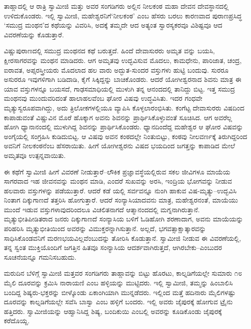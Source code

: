 ತಾಹ್ಲಾದಲ್ಲಿ ಆ ರಾತ್ರಿ ಸ್ವಾಮೀಜಿ ಮತ್ತು ಅವರ ಸಂಗಡಿಗರು ಅಲ್ಲಿನ ನೀಲಕಂಠ ಮಹಾ ದೇವನ ದೇವಸ್ಥಾನದಲ್ಲಿ ಉಳಿದುಕೊಂಡರು. ಇಲ್ಲಿ ಸ್ವಾಮೀಜಿ, ಮಹೇಶ್ವರನಿಗೆ‘ನೀಲಕಂಠ’ ಎಂಬ ಹೆಸರು ಬರಲು ಕಾರಣವಾದ ಪುರಾಣಪ್ರಸಿದ್ಧ ‘ಸಮುದ್ರ ಮಂಥನ’ದ ಕಥೆಯನ್ನು ವಿವರಿಸಿ, ಅದಕ್ಕೆ ತಮ್ಮದೇ ಆದ ಅತ್ಯಂತ ಸ್ವಾರಸ್ಯಕರವೂ ವಿಶಿಷ್ಟವೂ ಆದ ವಿವರಣೆಯನ್ನು ಕೊಡುತ್ತಾರೆ.

ವಿಷ್ಣುಪುರಾಣದಲ್ಲಿ ಸಮುದ್ರ ಮಂಥನದ ಕಥೆ ಬರುತ್ತದೆ. ಹಿಂದೆ ದೇವಾಸುರರು ಅಮೃತ ವನ್ನು ಬಯಸಿ, ಕ್ಷೀರಸಾಗರವನ್ನು ಮಂಥನ ಮಾಡಿದರು. ಆಗ ಅಮೃತವು ಉದ್ಭವಿಸುವ ಮೊದಲು, ಕಾಮಧೇನು, ಪಾರಿಜಾತ, ಚಂದ್ರ, ಐರಾವತ, ಅಪ್ಸರಸ್ತ್ರೀಯರು ಮೊದಲಾದ ಹಲ ವಾರು ಅದ್ಭುತ-ಸುಂದರ ವಸ್ತುಗಳು ಹುಟ್ಟಿ ಬಂದುವು. ಸುರರೂ ಅಸುರರೂ ಇವುಗಳಿಗಾಗಿ ಬಡಿದಾಡಿ, ಕೈಗೆ ಸಿಕ್ಕಿದ್ದನ್ನು ಬಾಚಿಕೊಂಡರು. ಆದರೆ ಯೋಗೀಶ್ವರನಾದ ಶಿವನು ಮಾತ್ರ ಈ ಯಾವ ವಸ್ತುಗಳನ್ನೂ ಬಯಸದೆ, ಗಾಢಸಮಾಧಿಯಲ್ಲಿ ಮುಳುಗಿ ತನ್ನ ಆನಂದದಲ್ಲಿ ತಾನಿದ್ದು ಬಿಟ್ಟ. ಇತ್ತ ಸಮುದ್ರ ಮಂಥನವು ಮುಂದುವರಿದಂತೆ ಹಾಲಾಹಲವೆಂಬ ಘೋರ ವಿಷವು ಉದ್ಧವಿಸಿತು. ಇದರ ಗಂಧವೇ ಮೃತ್ಯುಸ್ವರೂಪವಾಗಿದ್ದು, ಅದು ತ್ರಿಲೋಕಗಳಲ್ಲಿಯೂ ವ್ಯಾಪಿಸಿ ಕೊಳ್ಳಲಾರಂಭಿಸಿತು. ಕಂಗೆಟ್ಟ ದೇವಾಸುರರು ವಿಷದಿಂದ ಕಾಪಾಡುವಂತೆ ವಿಷ್ಣುವಿನ ಮೊರೆ ಹೊಕ್ಕಾಗ ಅವನು ಶಿವನನ್ನು ಪ್ರಾರ್ಥಿಸಿಕೊಳ್ಳುವಂತೆ ಸೂಚಿಸಿದ. ಆಗ ಅವರೆಲ್ಲ ಹೋಗಿ ಧ್ಯಾನಾನಂದಲ್ಲಿ ಮುಳುಗಿದ್ದ ಶಿವನನ್ನು ಪ್ರಾರ್ಥಿಸಿಕೊಂಡರು. ಧ್ಯಾನದಿಂದೆದ್ದ ಮಹೇಶ್ವರ ಆ ಘೋರ ವಿಷವನ್ನು ಅಂಗೈಯಲ್ಲಿ ಸಂಗ್ರಹಿಸಿ ಕುಡಿದುಬಿಟ್ಟ. ಆ ವಿಷವು ಅವನ ಕಂಠದಲ್ಲೇ ನಿಂತುಬಿಟ್ಟು, ಕಂಠವು ನೀಲವರ್ಣಕ್ಕೆ ತಿರುಗಿದ್ದರಿಂದ ಅವನಿಗೆ ನೀಲಕಂಠನೆಂಬ ಹೆಸರಾಯಿತು. ಹೀಗೆ ಯೋಗೀಶ್ವರನು ವಿಷದ ಭಯದಿಂದ ಜಗತ್ತನ್ನು ಕಾಪಾಡಿದ ಮೇಲೆ ಅಮೃತವೂ ಉತ್ಪನ್ನವಾಯಿತು.

ಈ ಕಥೆಗೆ ಸ್ವಾಮೀಜಿ ಹೀಗೆ ವಿವರಣೆ ನೀಡುತ್ತಾರೆ–ಲೌಕಿಕ ಪ್ರಜ್ಞಾವಸ್ಥೆಯಲ್ಲಿರುವ ಸಕಲ ಜೀವಿಗಳೂ ಮಾಯೆಯ ಸಾಗರವಾದ ಇಹ ಜೀವನವನ್ನು ಮಂಥನ ಮಾಡಿ, ಎಂದರೆ ಸುಖವನ್ನು ಅರಸಿ, ಇಂದ್ರಿಯ ಭೋಗವನ್ನು ನೀಡುವ ಹಲವಾರು ವಸ್ತುಗಳನ್ನು ಪಡೆಯುತ್ತಾರೆ. ಆದರೆ ಕಡೆ ಯಲ್ಲಿ ಸರ್ವವನ್ನೂ ನುಂಗಿ ಹಾಕುವ ವಿಷ-ಮೃತ್ಯು–ಉದ್ಭವಿಸಿ ನಿಂತಾಗ ದಿಕ್ಕುಗಾಣದೆ ತತ್ತರಿಸಿ ಹೋಗುತ್ತಾರೆ. ಆದರೆ ಸಂನ್ಯಾಸಿಯಾದವನು ಮಾತ್ರ, ಮಹೇಶ್ವರನಂತೆ, ಮಾಯೆಯು ಮುಂದೆ ಇಡುವ ವಸ್ತುಗಳಾವುದರಿಂದಲೂ ವಿಚಲಿತನಾಗದೆ ಆತ್ಮಾನಂದದಲ್ಲಿ ಮಗ್ನನಾಗಿರುತ್ತಾನೆ. ಮೃತ್ಯುಭೀತಿಪೀಡಿತರಾದ ಜನರು ದಿಕ್ಕುಗಾಣದೆ ಸಂನ್ಯಾಸಿಯ ಬಳಿಗೆ ಓಡಿಹೋಗಿ ಶರಣಾದಾಗ, ಅವನು ಮಾಯೆಯನ್ನು ಪರಿಹರಿಸಿ ಮೃತ್ಯುಭೀತಿಯಿಂದ ಅವರನ್ನು ವಿಮುಕ್ತರನ್ನಾಗಿಸುತ್ತಾನೆ. ಅಲ್ಲದೆ, ಭಗವತ್ಸಾಕ್ಷಾತ್ಕಾರವನ್ನು ಸಾಧಿಸಿಕೊಂಡವನಿಗೆ ಮರಣಭಯವಿಲ್ಲವೆಂಬುದನ್ನು ತೋರಿಸಿ ಕೊಡುತ್ತಾನೆ. ಸ್ವಾಮೀಜಿ ನೀಡುವ ಈ ವಿವರಣೆಯಲ್ಲಿ, ತನ್ನ ಸ್ವಂತ ಮುಕ್ತಿಯೊಂದಿಗೆ ಜಗತ್ತಿನ ಹಿತವೂ ಸಂನ್ಯಾಸಿಯ ಆದರ್ಶವಾಗಿರುತ್ತದೆ, ಆಗಿರಬೇಕು–ಎಂಬುದರ ಸೂಚನೆಯನ್ನೂ ಗಮನಿಸಬಹುದು.

ಮರುದಿನ ಬೆಳಿಗ್ಗೆ ಸ್ವಾಮೀಜಿ ಮತ್ತವರ ಸಂಗಡಿಗರು ತಾಹ್ಲಾವನ್ನು ಬಿಟ್ಟು ಹೊರಟು, ಕಾಲ್ನಡಿಗೆಯಲ್ಲೇ ಸುಮಾರು ೧೮ ಮೈಲಿ ದೂರವನ್ನು ಕ್ರಮಿಸಿ ನಾರಾಯಣಿ ಎಂಬ ಹಳ್ಳಿಯನ್ನು ಮುಟ್ಟಿದರು. ಇಲ್ಲಿ ಸ್ವಾಮೀಜಿ, ತಮ್ಮನ್ನು ಹಿಂಬಾಲಿಸಿ ಬಂದಿದ್ದ ಶಿಷ್ಯರು-ಭಕ್ತರನ್ನು ಬೀಳ್ಕೊಂಡು ಏಕಾಂಗಿಯಾಗಿ ಮುನ್ನಡೆದರು. ಇಲ್ಲಿಂದ ಮತ್ತೆ ಹದಿನಾರು ಮೈಲಿಗಳಷ್ಟು ದೂರವನ್ನು ಕಾಲ್ನಡಿಗೆಯಲ್ಲೇ ಸವೆಸಿ ಬಾಸ್ವಾ ಎಂಬ ಹಳ್ಳಿಗೆ ಬಂದರು. ಇಲ್ಲಿ ಅವರು ಜೈಪುರಕ್ಕೆ ಹೋಗುವ ಟ್ರೈನು ಹತ್ತಿದರು. ಸ್ವಾಮೀಜಿಯನ್ನು ಆಹ್ವಾನಿಸಿದ್ದ ಶಿಷ್ಯ, ಬಂದಿಕುಯಿ ಎಂಬಲ್ಲಿ ಅವರನ್ನು ಕೂಡಿಕೊಂಡು ಜೈಪುರಕ್ಕೆ ಕರೆದೊಯ್ದ.

